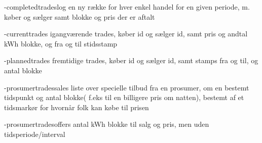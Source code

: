 -completedtradeslog
    en ny række for hver enkel handel for en given periode, m. køber og sælger samt blokke og pris der er aftalt

-currenttrades
    igangværende trades, køber id og sælger id, samt pris og andtal kWh blokke, og fra og til stidsstamp

-plannedtrades
    fremtidige trades, køber id og sælger id, samt stamps fra og til, og antal blokke

-prosumertradessales
    liste over specielle tilbud fra en prosumer, om en bestemt tidspunkt og antal blokke( f.eks til en billigere pris om natten), bestemt af et tidsmarkør for hvornår folk kan købe til prisen

-prosumertradesoffers
    antal kWh blokke til salg og pris, men uden tidsperiode/interval